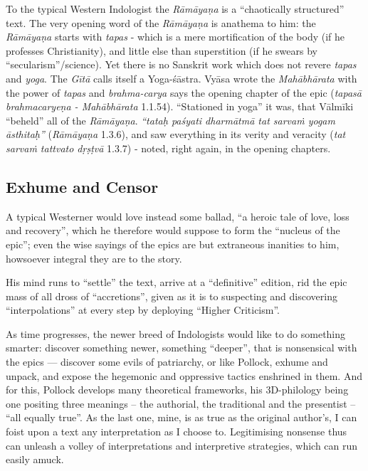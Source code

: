 To the typical Western Indologist the {\sl Rāmāyaṇa} is a ``chaotically structured'' text. The very opening word of the {\sl Rāmāyaṇa} is anathema to him: the {\sl Rāmāyaṇa} starts with {\sl tapas} -  which is a mere mortification of the body (if he professes Christianity), and little else than superstition (if he swears by ``secularism''/science). Yet there is no Sanskrit work which does not revere {\sl tapas} and {\sl yoga}. The {\sl Gītā} calls itself a Yoga-śāstra. Vyāsa wrote the {\sl Mahābhārata} with the power of {\sl tapas} and {\sl brahma-carya} says the opening chapter of the epic ({\sl tapasā brahmacaryeṇa  - Mahābhārata} 1.1.54). ``Stationed in yoga'' it was, that Vālmīki  ``beheld'' all of the {\sl Rāmāyaṇa}. {\sl ``tataḥ paśyati dharmātmā tat sarvaṁ yogam āsthitaḥ''} ({\sl Rāmāyaṇa} 1.3.6), and saw everything in its verity and veracity ({\sl tat sarvaṁ tattvato dṛṣṭvā} 1.3.7) - noted, right again, in the opening chapters.\\[-20pt]

\subsection*{Exhume and Censor}

A typical Westerner would love instead some ballad, ``a heroic tale of love, loss and recovery'', which he therefore would suppose to form the ``nucleus of the epic''; even the wise sayings of the epics are but extraneous inanities to him, howsoever integral they are to the story.

His mind runs to “settle” the text, arrive at a “definitive” edition, rid the epic mass of all dross of  “accretions”, given as it is to suspecting and discovering “interpolations” at every step by deploying “Higher Criticism”.

As time progresses, the newer breed of Indologists would like to do something smarter: discover something newer, something “deeper”, that is nonsensical with the epics --- discover some evils of patriarchy, or like Pollock, exhume and unpack, and expose the hegemonic and oppressive tactics enshrined in them. And for this, Pollock develops many theoretical frameworks, his 3D-philology being one positing three meanings -- the authorial, the traditional and the presentist -- “all equally true”. As the last one, mine, is as true as the original author's, I can foist upon a text any interpretation as I choose to. Legitimising nonsense thus can unleash a volley of interpretations and interpretive strategies, which can run easily amuck.

